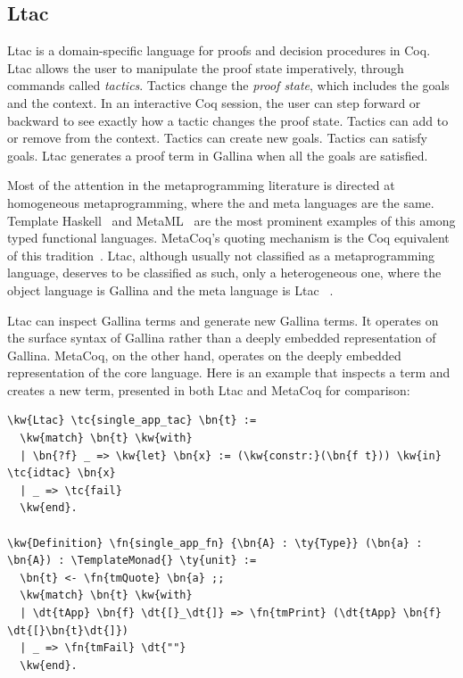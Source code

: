 \subsection{Ltac}\label{ltac}
\gls{Ltac} is a domain-specific language for proofs and decision procedures in Coq. \gls{Ltac} allows the user to manipulate the proof state imperatively, through commands called \emph{tactics}. Tactics change the \emph{proof state}, which includes the goals and the context. In an interactive Coq session, the user can step forward or backward to see exactly how a tactic changes the proof state. Tactics can add to or remove from the context. Tactics can create new goals. Tactics can satisfy goals. \gls{Ltac} generates a proof term in \gls{Gallina} when all the goals are satisfied.

Most of the attention in the \gls{metaprogramming} literature is directed at homogeneous \gls{metaprogramming}, where the  and \gls{meta language}s are the same. Template Haskell~\cite{sheard2002template} and MetaML~\cite{taha2000metaml} are the most prominent examples of this among typed functional languages. MetaCoq's quoting mechanism is the Coq equivalent of this tradition~\cite{templatecoq}.
\gls{Ltac}, although usually not classified as a \gls{metaprogramming} language, deserves to be classified as such, only a heterogeneous one, where the object language is \gls{Gallina} and the meta language is \gls{Ltac} ~\cite{bergerSlides}.

\gls{Ltac} can inspect \gls{Gallina} terms and generate new \gls{Gallina} terms. It operates on the surface syntax of \gls{Gallina} rather than a deeply embedded representation of \gls{Gallina}. MetaCoq, on the other hand, operates on the deeply embedded representation of the core language. Here is an example that inspects a term and creates a new term, presented in both \gls{Ltac} and MetaCoq for comparison:

\begin{Verbatim}
\kw{Ltac} \tc{single_app_tac} \bn{t} :=
  \kw{match} \bn{t} \kw{with}
  | \bn{?f} _ => \kw{let} \bn{x} := (\kw{constr:}(\bn{f t})) \kw{in} \tc{idtac} \bn{x}
  | _ => \tc{fail}
  \kw{end}.

\kw{Definition} \fn{single_app_fn} {\bn{A} : \ty{Type}} (\bn{a} : \bn{A}) : \TemplateMonad{} \ty{unit} :=
  \bn{t} <- \fn{tmQuote} \bn{a} ;;
  \kw{match} \bn{t} \kw{with}
  | \dt{tApp} \bn{f} \dt{[}_\dt{]} => \fn{tmPrint} (\dt{tApp} \bn{f} \dt{[}\bn{t}\dt{]})
  | _ => \fn{tmFail} \dt{""}
  \kw{end}.
\end{Verbatim}

